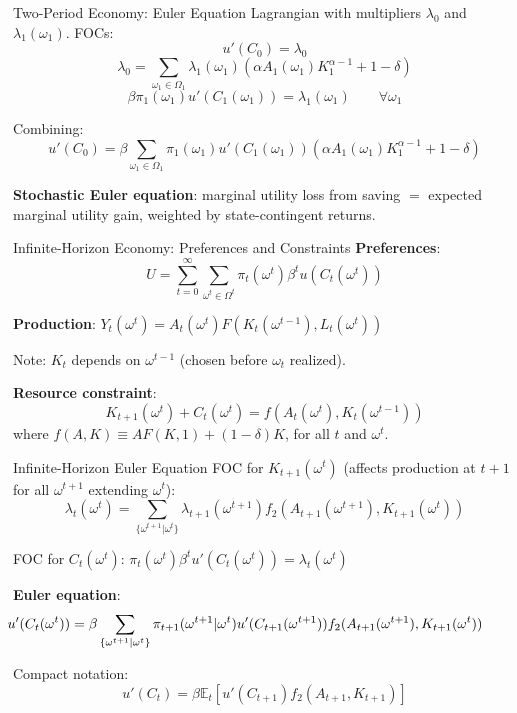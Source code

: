 \documentclass[blue]{beamer}
\newcommand{\E}{\mathbb{E}}
\begin{document}
\begin{frame}{Two-Period Economy: Euler Equation}
	Lagrangian with multipliers $\lambda_0$ and $\lambda_1(\omega_1)$. FOCs:
	\[
	u'(C_0) = \lambda_0
	\]
	\[
	\lambda_0 = \sum_{\omega_1 \in \Omega_1} \lambda_1(\omega_1)(\alpha A_1(\omega_1) K_1^{\alpha-1} + 1 - \delta)
	\]
	\[
	\beta \pi_1(\omega_1) u'(C_1(\omega_1)) = \lambda_1(\omega_1) \qquad \forall \omega_1
	\]
	
	Combining:
	\[
	u'(C_0) = \beta \sum_{\omega_1 \in \Omega_1} \pi_1(\omega_1) u'(C_1(\omega_1))(\alpha A_1(\omega_1) K_1^{\alpha-1} + 1 - \delta)
	\]
	
	\textbf{Stochastic Euler equation}: marginal utility loss from saving $=$ expected marginal utility gain, weighted by state-contingent returns.
\end{frame}

\begin{frame}{Infinite-Horizon Economy: Preferences and Constraints}
	\textbf{Preferences}:
	\[
	U = \sum_{t=0}^{\infty} \sum_{\omega^t \in \Omega^t} \pi_t(\omega^t) \beta^t u(C_t(\omega^t))
	\]
	
	\textbf{Production}: $Y_t(\omega^t) = A_t(\omega^t) F(K_t(\omega^{t-1}), L_t(\omega^t))$
	
	Note: $K_t$ depends on $\omega^{t-1}$ (chosen before $\omega_t$ realized).
	
	\bigskip
	\textbf{Resource constraint}:
	\[
	K_{t+1}(\omega^t) + C_t(\omega^t) = f(A_t(\omega^t), K_t(\omega^{t-1}))
	\]
	where $f(A,K) \equiv AF(K,1) + (1-\delta)K$, for all $t$ and $\omega^t$.
\end{frame}

\begin{frame}{Infinite-Horizon Euler Equation}
	FOC for $K_{t+1}(\omega^t)$ (affects production at $t+1$ for all $\omega^{t+1}$ extending $\omega^t$):
	\[
	\lambda_t(\omega^t) = \sum_{\{\omega^{t+1} | \omega^t\}} \lambda_{t+1}(\omega^{t+1}) f_2(A_{t+1}(\omega^{t+1}), K_{t+1}(\omega^t))
	\]
	
	FOC for $C_t(\omega^t)$: $\pi_t(\omega^t) \beta^t u'(C_t(\omega^t)) = \lambda_t(\omega^t)$
	
	\bigskip
	\textbf{Euler equation}:
	\[
	\hspace{-28pt} u'(C_t(\omega^t)) = \beta \sum_{\{\omega^{t+1} | \omega^t\}} \pi_{t+1}(\omega^{t+1} | \omega^t) u'(C_{t+1}(\omega^{t+1})) f_2(A_{t+1}(\omega^{t+1}), K_{t+1}(\omega^t))
	\]
	
	Compact notation:
	\[
	u'(C_t) = \beta \E_t[u'(C_{t+1}) f_2(A_{t+1}, K_{t+1})]
	\]
\end{frame}
\end{document}

